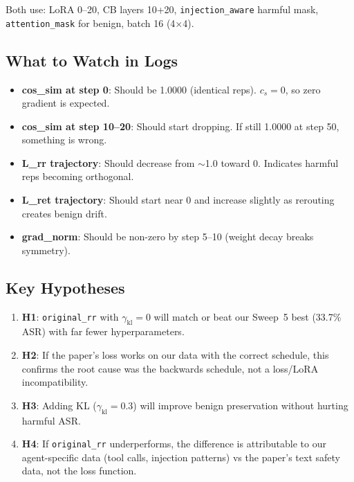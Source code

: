 \documentclass[11pt]{article}
\begin{document}
Both use: LoRA 0--20, CB layers 10+20, \texttt{injection\_aware} harmful mask,
\texttt{attention\_mask} for benign, batch 16 (4$\times$4).

\subsection{What to Watch in Logs}

\begin{itemize}
  \item \textbf{cos\_sim at step 0}: Should be 1.0000 (identical reps). $c_s = 0$, so zero gradient is expected.
  \item \textbf{cos\_sim at step 10--20}: Should start dropping. If still 1.0000 at step 50, something is wrong.
  \item \textbf{L\_rr trajectory}: Should decrease from $\sim$1.0 toward 0. Indicates harmful reps becoming orthogonal.
  \item \textbf{L\_ret trajectory}: Should start near 0 and increase slightly as rerouting creates benign drift.
  \item \textbf{grad\_norm}: Should be non-zero by step 5--10 (weight decay breaks symmetry).
\end{itemize}

\subsection{Key Hypotheses}

\begin{enumerate}
  \item \textbf{H1}: \texttt{original\_rr} with $\gamma_\mathrm{kl}=0$ will match or beat
        our Sweep~5 best (33.7\% ASR) with far fewer hyperparameters.
  \item \textbf{H2}: If the paper's loss works on our data with the correct schedule,
        this confirms the root cause was the backwards schedule, not a loss/LoRA
        incompatibility.
  \item \textbf{H3}: Adding KL ($\gamma_\mathrm{kl}=0.3$) will improve benign
        preservation without hurting harmful ASR.
  \item \textbf{H4}: If \texttt{original\_rr} underperforms, the difference is
        attributable to our agent-specific data (tool calls, injection patterns)
        vs the paper's text safety data, not the loss function.
\end{enumerate}

\end{document}
